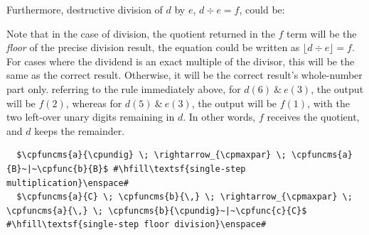Furthermore, destructive division of \(d\) by \(e\), \(d \div e = f\), could be:

Note that in the case of division, the quotient returned in the \(f\) term will be the \emph{floor} of the precise division result, \ie{} the equation could be written as \(\lfloor d \div e \rfloor = f\).  For cases where the dividend is an exact multiple of the divisor, this will be the same as the correct result.  Otherwise, it will be the correct result's whole-number part only.  \Eg{} referring to the rule immediately above, for \(d(6)~\&~e(3)\), the output will be \(f(2)\), whereas for \(d(5)~\&~e(3)\), the output will be \(f(1)\), with the two left-over unary digits remaining in \(d\).  In other words, \(f\) receives the quotient, and \(d\) keeps the remainder.

\lstset{xleftmargin=.5in, xrightmargin=.5in} 
\begin{lstlisting}
  $\cpfuncms{a}{\cpundig} \; \rightarrow_{\cpmaxpar} \; \cpfuncms{a}{B}~|~\cpfunc{b}{B}$ #\hfill\textsf{single-step multiplication}\enspace#
  $\cpfuncms{a}{C} \; \cpfuncms{b}{\,} \; \rightarrow_{\cpmaxpar} \; \cpfuncms{a}{\,} \; \cpfuncms{b}{\cpundig}~|~\cpfunc{c}{C}$ #\hfill\textsf{single-step floor division}\enspace#
\end{lstlisting}